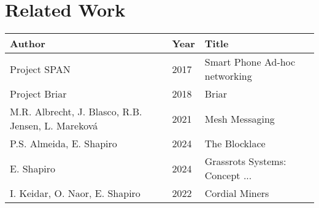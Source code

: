 \section{Related Work}

\begin{frame}
    \begin{table}[h]
        \centering
        \begin{tabular}{llp{8cm}}
            \toprule
            Author & Year & Title \\
            \midrule
            Project SPAN & 2017 & Smart Phone Ad-hoc networking \\
            Project Briar & 2018 & Briar \\
            M.R. Albrecht, J. Blasco, R.B. Jensen, L. Mareková & 2021 & Mesh Messaging \\
            P.S. Almeida, E. Shapiro & 2024 & The Blocklace \\
            E. Shapiro & 2024 & Grassrots Systems: Concept ... \\
            I. Keidar, O. Naor, E. Shapiro & 2022 & Cordial Miners \\
        \end{tabular}
    \end{table}
\end{frame}